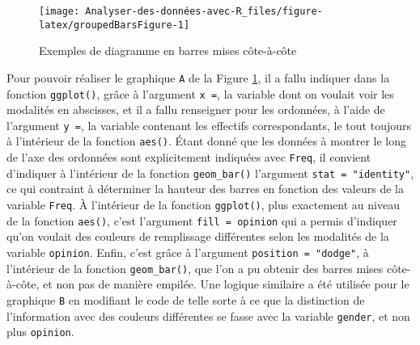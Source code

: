 \documentclass[
  french,
]{book}
\begin{document}
\begin{figure}

{\centering \texttt{[image: Analyser-des-données-avec-R\_files/figure-latex/groupedBarsFigure-1]} 

}

\caption{Exemples de diagramme en barres mises côte-à-côte}\label{fig:groupedBarsFigure}
\end{figure}

Pour pouvoir réaliser le graphique \texttt{A} de la Figure \ref{fig:groupedBarsFigure}, il a fallu indiquer dans la fonction \texttt{ggplot()}, grâce à l'argument \texttt{x\ =}, la variable dont on voulait voir les modalités en abscisses, et il a fallu renseigner pour les ordonnées, à l'aide de l'argument \texttt{y\ =}, la variable contenant les effectifs correspondants, le tout toujours à l'intérieur de la fonction \texttt{aes()}. Étant donné que les données à montrer le long de l'axe des ordonnées sont explicitement indiquées avec \texttt{Freq}, il convient d'indiquer à l'intérieur de la fonction \texttt{geom\_bar()} l'argument \texttt{stat\ =\ "identity"}, ce qui contraint à déterminer la hauteur des barres en fonction des valeurs de la variable \texttt{Freq}. À l'intérieur de la fonction \texttt{ggplot()}, plus exactement au niveau de la fonction \texttt{aes()}, c'est l'argument \texttt{fill\ =\ opinion} qui a permis d'indiquer qu'on voulait des couleurs de remplissage différentes selon les modalités de la variable \texttt{opinion}. Enfin, c'est grâce à l'argument \texttt{position\ =\ "dodge"}, à l'intérieur de la fonction \texttt{geom\_bar()}, que l'on a pu obtenir des barres mises côte-à-côte, et non pas de manière empilée. Une logique similaire a été utilisée pour le graphique \texttt{B} en modifiant le code de telle sorte à ce que la distinction de l'information avec des couleurs différentes se fasse avec la variable \texttt{gender}, et non plus \texttt{opinion}.
\end{document}
